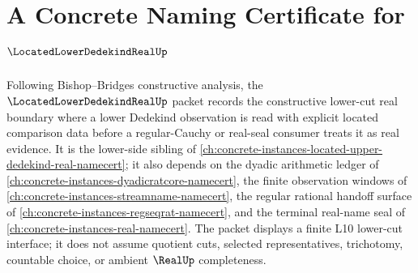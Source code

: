 \chapter{A Concrete Naming Certificate for $\LocatedLowerDedekindRealUp$}
\label{ch:concrete-instances-located-lower-dedekind-real-namecert}

Following Bishop--Bridges constructive analysis, the $\LocatedLowerDedekindRealUp$ packet records the constructive lower-cut real boundary where a lower Dedekind observation is read with explicit located comparison data before a regular-Cauchy or real-seal consumer treats it as real evidence. It is the lower-side sibling of \autoref{ch:concrete-instances-located-upper-dedekind-real-namecert}; it also depends on the dyadic arithmetic ledger of \autoref{ch:concrete-instances-dyadicratcore-namecert}, the finite observation windows of \autoref{ch:concrete-instances-streamname-namecert}, the regular rational handoff surface of \autoref{ch:concrete-instances-regseqrat-namecert}, and the terminal real-name seal of \autoref{ch:concrete-instances-real-namecert}. The packet displays a finite L10 lower-cut interface; it does not assume quotient cuts, selected representatives, trichotomy, countable choice, or ambient $\RealUp$ completeness.

